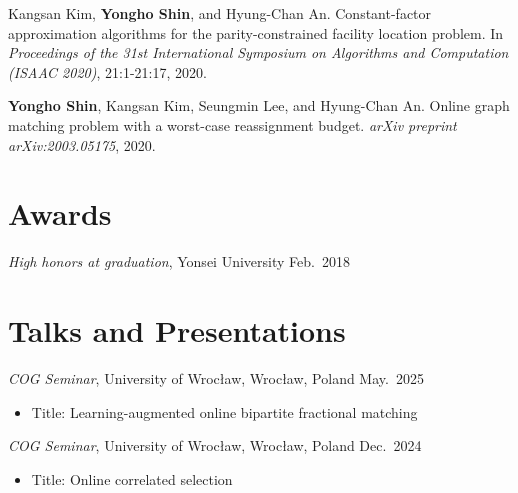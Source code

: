 \documentclass{article}
\newcommand{\killinitspace}{-0.7em}
\begin{document}
Kangsan Kim, \textbf{Yongho Shin}, and Hyung-Chan An. Constant-factor approximation algorithms for the parity-constrained facility location problem. In \emph{Proceedings of the 31st International Symposium on Algorithms and Computation (ISAAC 2020)}, 21:1-21:17, 2020.

\textbf{Yongho Shin}, Kangsan Kim, Seungmin Lee, and Hyung-Chan An. Online graph matching problem with a worst-case reassignment budget. \emph{arXiv preprint arXiv:2003.05175}, 2020.

\section{Awards}
\textsl{High honors at graduation}, Yonsei University \hfill Feb.~2018

\section{Talks and Presentations}
\textsl{COG Seminar}, University of Wrocław, Wrocław, Poland  \hfill May.~2025
\vspace{\killinitspace}
\begin{itemize}
\item Title: Learning-augmented online bipartite fractional matching
\end{itemize}

\textsl{COG Seminar}, University of Wrocław, Wrocław, Poland  \hfill Dec.~2024
\vspace{\killinitspace}
\begin{itemize}
\item Title: Online correlated selection
\end{itemize}
\end{document}
